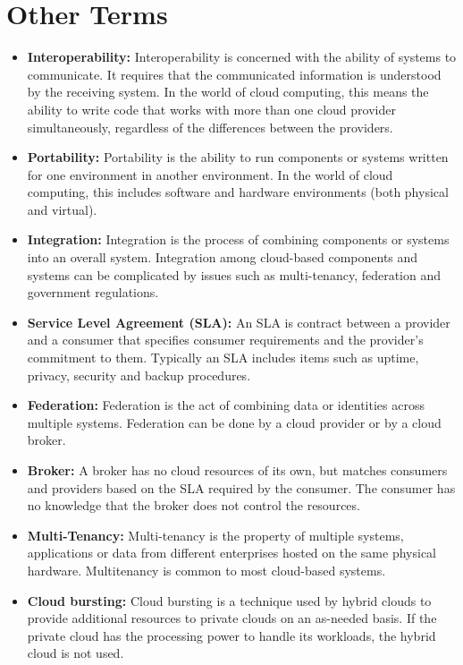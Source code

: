 \section{Other Terms}
\begin{itemize}
  \item {\bf Interoperability:} Interoperability is concerned with the ability of systems to communicate. It requires that the 
        communicated information is understood by the receiving system. In the world of cloud computing, this means the ability 
        to write code that works with more than one cloud provider simultaneously, regardless of the differences between the providers.
  \item {\bf Portability:} Portability is the ability to run components or systems written for one environment in another environment. 
        In the world of cloud computing, this includes software and hardware environments (both physical and virtual).
  \item {\bf Integration:} Integration is the process of combining components or systems into an overall system. Integration among 
        cloud-based components and systems can be complicated by issues such as multi-tenancy, federation and government regulations.        
  \item {\bf Service Level Agreement (SLA):} An SLA is contract between a provider and a consumer that specifies consumer requirements 
        and the provider’s commitment to them. Typically an SLA includes items such as uptime, privacy, security and backup procedures.
  \item {\bf Federation:} Federation is the act of combining data or identities across multiple systems. Federation can be done by a 
        cloud provider or by a cloud broker.
  \item {\bf Broker:} A broker has no cloud resources of its own, but matches consumers and providers based on the SLA required by the
        consumer. The consumer has no knowledge that the broker does not control the resources.      
  \item {\bf Multi-Tenancy:} Multi-tenancy is the property of multiple systems, applications or data from different enterprises hosted 
        on the same physical hardware. Multitenancy is common to most cloud-based systems.
  \item {\bf Cloud bursting:} Cloud bursting is a technique used by hybrid clouds to provide additional resources to private clouds on 
        an as-needed basis. If the private cloud has the processing power to handle its workloads, the hybrid cloud is not used.

\end{itemize}
